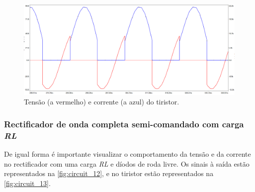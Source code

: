 \documentclass[a4paper,11pt]{article}
\numberwithin{equation}{section}
\begin{document}
\begin{figure}[h]
	\centering
	\includegraphics[keepaspectratio=true, scale=0.4]{img/circuito9}
	\caption{Tensão (a vermelho) e corrente (a azul) do tiristor.}
	\label{fig:circuit_11}
	\vspace{-0.8em}
\end{figure}

\vspace{12mm}


\subsubsection{Rectificador de onda completa semi-comandado com carga \textit{RL}}

De igual forma é importante visualizar o comportamento da tensão e da corrente no rectificador com uma carga \textit{RL} e díodos de roda livre. Os sinais à saída estão representados na \autoref{fig:circuit_12}, e no tiristor estão representados na \autoref{fig:circuit_13}.
\end{document}
